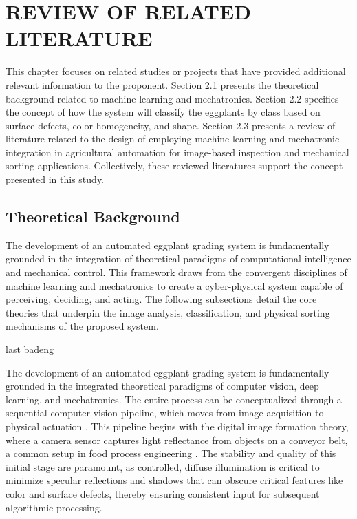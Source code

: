 \chapter{REVIEW OF RELATED LITERATURE}
{\baselineskip
 This chapter focuses on related studies or projects that have provided additional relevant information to the proponent. Section 2.1 presents the theoretical background related to machine learning and mechatronics. Section 2.2 specifies the concept of how the system will classify the eggplants by class based on surface defects, color homogeneity, and shape. Section 2.3 presents a review of literature related to the design of employing machine learning and mechatronic integration in agricultural automation for image-based inspection and mechanical sorting applications. Collectively, these reviewed literatures support the concept presented in this study. 

\section{Theoretical Background}
The development of an automated eggplant grading system is fundamentally grounded in the integration of theoretical paradigms of computational intelligence and mechanical control. This framework draws from the convergent disciplines of machine learning and mechatronics to create a cyber-physical system capable of perceiving, deciding, and acting. The following subsections detail the core theories that underpin the image analysis, classification, and physical sorting mechanisms of the proposed system.


last badeng


The development of an automated eggplant grading system is fundamentally grounded in the integrated theoretical paradigms of computer vision, deep learning, and mechatronics. The entire process can be conceptualized through a sequential computer vision pipeline, which moves from image acquisition to physical actuation \citep{szeliski2022computer}. This pipeline begins with the digital image formation theory, where a camera sensor captures light reflectance from objects on a conveyor belt, a common setup in food process engineering \citep{dougherty2020digital}. The stability and quality of this initial stage are paramount, as controlled, diffuse illumination is critical to minimize specular reflections and shadows that can obscure critical features like color and surface defects, thereby ensuring consistent input for subsequent algorithmic processing.

}
